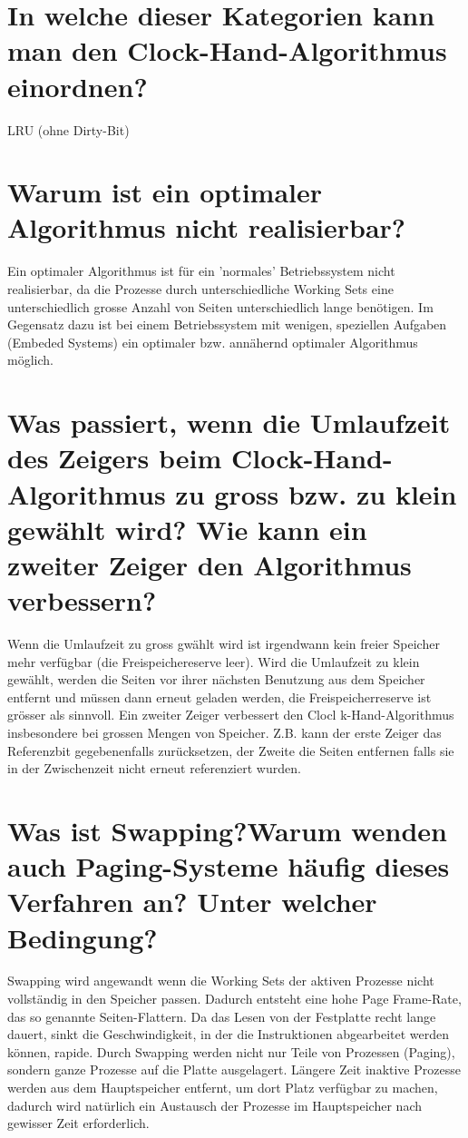 \documentclass[12pt,a4paper,ngerman]{scrartcl}
\newcommand{\question}[1]{#1}
\newenvironment {answer}
                {}
                {}
\begin{document}
\section{\question{In welche dieser Kategorien kann man den Clock-Hand-Algorithmus einordnen?}}
\begin{answer}
LRU (ohne Dirty-Bit)
\end{answer}

\section{\question{Warum ist ein optimaler Algorithmus nicht realisierbar?}}
\begin{answer}
Ein optimaler Algorithmus ist für ein 'normales' Betriebssystem nicht realisierbar, da die Prozesse
durch unterschiedliche Working Sets eine unterschiedlich grosse Anzahl von Seiten unterschiedlich
lange benötigen.
Im Gegensatz dazu ist bei einem Betriebssystem mit wenigen, speziellen Aufgaben (Embeded
Systems) ein optimaler bzw. annähernd optimaler Algorithmus möglich.
\end{answer}

\section{\question{Was passiert, wenn die Umlaufzeit des Zeigers beim Clock-Hand-Algorithmus zu gross bzw. zu
klein gewählt wird? Wie kann ein zweiter Zeiger den Algorithmus verbessern?}}
\begin{answer}
Wenn die Umlaufzeit zu gross gwählt wird ist irgendwann kein freier Speicher mehr verfügbar (die
Freispeichereserve leer).
Wird die Umlaufzeit zu klein gewählt, werden die Seiten vor ihrer nächsten Benutzung aus dem
Speicher entfernt und müssen dann erneut geladen werden, die Freispeicherreserve ist grösser als
sinnvoll.
Ein zweiter Zeiger verbessert den Clocl k-Hand-Algorithmus insbesondere bei grossen Mengen von
Speicher. Z.B. kann der erste Zeiger das Referenzbit gegebenenfalls zurücksetzen, der Zweite die
Seiten entfernen falls sie in der Zwischenzeit nicht erneut referenziert wurden.
\end{answer}

\section{\question{Was ist Swapping?Warum wenden auch Paging-Systeme häufig dieses Verfahren an? Unter welcher Bedingung?}}
\begin{answer}
Swapping wird angewandt wenn die Working Sets der aktiven Prozesse nicht vollständig in den
Speicher passen.
Dadurch entsteht eine hohe Page Frame-Rate, das so genannte Seiten-Flattern. Da das Lesen
von der Festplatte recht lange dauert, sinkt die Geschwindigkeit, in der die Instruktionen abgearbeitet
werden können, rapide.
Durch Swapping werden nicht nur Teile von Prozessen (Paging), sondern ganze Prozesse auf die
Platte ausgelagert. Längere Zeit inaktive Prozesse werden aus dem Hauptspeicher entfernt, um
dort Platz verfügbar zu machen, dadurch wird natürlich ein Austausch der Prozesse im Hauptspeicher
nach gewisser Zeit erforderlich.
\end{answer}
\end{document}
